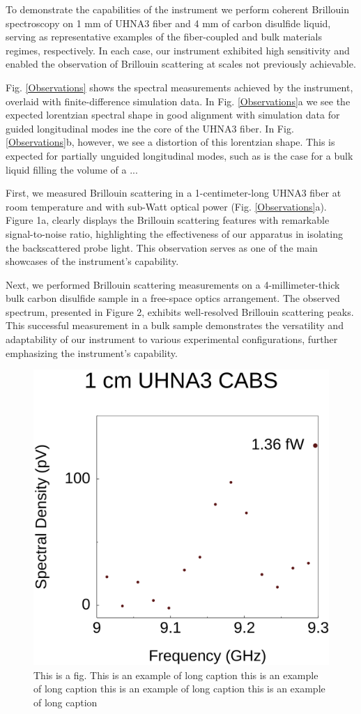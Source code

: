 \documentclass[pdflatex,iicol]{sn-jnl}%
\begin{document}
To demonstrate the capabilities of the instrument we perform coherent Brillouin spectroscopy on 1 mm of UHNA3 fiber and 4 mm of carbon disulfide liquid, serving as representative examples of the fiber-coupled and bulk materials regimes, respectively. In each case, our instrument exhibited high sensitivity and enabled the observation of Brillouin scattering at scales not previously achievable.

Fig. \ref{Observations} shows the spectral measurements achieved by the instrument, overlaid with finite-difference simulation data. In Fig. \ref{Observations}a we see the expected lorentzian spectral shape in good alignment with simulation data for guided longitudinal modes ine the core of the UHNA3 fiber. In Fig. \ref{Observations}b, however, we see a distortion of this lorentzian shape. This is expected for partially unguided longitudinal modes, such as is the case for a bulk liquid filling the volume of a ...

First, we measured Brillouin scattering in a 1-centimeter-long UHNA3 fiber at room temperature and with sub-Watt optical power (Fig. \ref{Observations}a). Figure 1a, clearly displays the Brillouin scattering features with remarkable signal-to-noise ratio, highlighting the effectiveness of our apparatus in isolating the backscattered probe light. This observation serves as one of the main showcases of the instrument's capability.

Next, we performed Brillouin scattering measurements on a 4-millimeter-thick bulk carbon disulfide sample in a free-space optics arrangement. The observed spectrum, presented in Figure 2, exhibits well-resolved Brillouin scattering peaks. This successful measurement in a bulk sample demonstrates the versatility and adaptability of our instrument to various experimental configurations, further emphasizing the instrument's capability.

\begin{figure}[t]
\centering
\includegraphics[width=.45\textwidth]{Sensitivity.pdf}
\caption{This is a fig. This is an example of long caption this is an example of long caption this is an example of long caption this is an example of long caption}\label{Sensitivity}
\end{figure}
\end{document}
